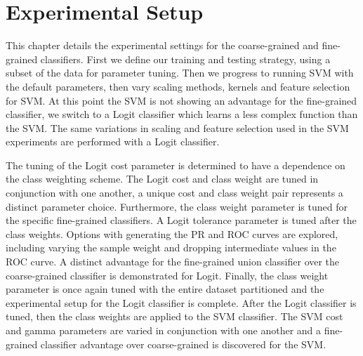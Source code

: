 \documentclass[ms]{nuthesis}
\begin{document}
\chapter{Experimental Setup}
\par This chapter details the experimental settings for the coarse-grained and fine-grained classifiers. First we
 define our training and testing strategy, using a subset of the data for parameter tuning.
 Then we progress to running SVM with the default parameters, then
 vary scaling methods, kernels and feature selection for SVM. At this point the SVM is not showing an advantage for
 the fine-grained classifier, we switch to a Logit classifier which learns a less complex
 function than the SVM. The same
 variations in scaling and feature selection used in the SVM experiments are performed with a Logit classifier.
 \par The tuning of the Logit cost parameter is determined to have a dependence on the class weighting scheme. The Logit
  cost and class weight are tuned in conjunction with one another, a unique cost and class weight pair represents
  a distinct parameter choice. Furthermore, the
 class weight parameter is tuned for the specific fine-grained classifiers. A Logit tolerance parameter is tuned
 after the class weights. Options with generating the PR and ROC curves are explored, including varying the sample weight
 and dropping intermediate values in the ROC curve. A distinct advantage for the fine-grained union classifier over the
 coarse-grained classifier is demonstrated for Logit. Finally, the class weight parameter is once again tuned with
 the entire dataset partitioned and the experimental setup for the Logit classifier is complete. After the Logit classifier
 is tuned, then the class weights are applied to the SVM classifier. The SVM cost and
  gamma parameters are varied in conjunction with one another
  and a fine-grained classifier advantage over coarse-grained is discovered for the SVM.
\end{document}
